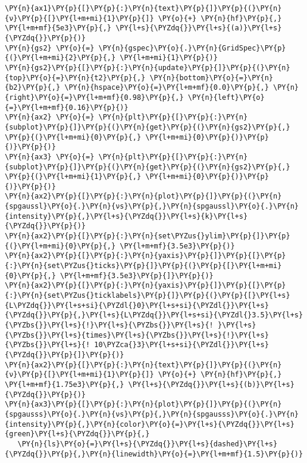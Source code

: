 \begin{Verbatim}[commandchars=\\\{\}]
\PY{n}{ax1}\PY{p}{[}\PY{p}{:}\PY{n}{text}\PY{p}{]}\PY{p}{(}\PY{n}{ν}\PY{p}{[}\PY{l+m+mi}{1}\PY{p}{]} \PY{o}{+} \PY{n}{hf}\PY{p}{,} \PY{l+m+mf}{5e3}\PY{p}{,} \PY{l+s}{\PYZdq{}}\PY{l+s}{(a)}\PY{l+s}{\PYZdq{}}\PY{p}{)}
\PY{n}{gs2} \PY{o}{=} \PY{n}{gspec}\PY{o}{.}\PY{n}{GridSpec}\PY{p}{(}\PY{l+m+mi}{2}\PY{p}{,} \PY{l+m+mi}{1}\PY{p}{)}
\PY{n}{gs2}\PY{p}{[}\PY{p}{:}\PY{n}{update}\PY{p}{]}\PY{p}{(}\PY{n}{top}\PY{o}{=}\PY{n}{t2}\PY{p}{,} \PY{n}{bottom}\PY{o}{=}\PY{n}{b2}\PY{p}{,} \PY{n}{hspace}\PY{o}{=}\PY{l+m+mf}{0.0}\PY{p}{,} \PY{n}{right}\PY{o}{=}\PY{l+m+mf}{0.98}\PY{p}{,} \PY{n}{left}\PY{o}{=}\PY{l+m+mf}{0.16}\PY{p}{)}
\PY{n}{ax2} \PY{o}{=} \PY{n}{plt}\PY{p}{[}\PY{p}{:}\PY{n}{subplot}\PY{p}{]}\PY{p}{(}\PY{n}{get}\PY{p}{(}\PY{n}{gs2}\PY{p}{,} \PY{p}{(}\PY{l+m+mi}{0}\PY{p}{,} \PY{l+m+mi}{0}\PY{p}{)}\PY{p}{)}\PY{p}{)}
\PY{n}{ax3} \PY{o}{=} \PY{n}{plt}\PY{p}{[}\PY{p}{:}\PY{n}{subplot}\PY{p}{]}\PY{p}{(}\PY{n}{get}\PY{p}{(}\PY{n}{gs2}\PY{p}{,} \PY{p}{(}\PY{l+m+mi}{1}\PY{p}{,} \PY{l+m+mi}{0}\PY{p}{)}\PY{p}{)}\PY{p}{)}
\PY{n}{ax2}\PY{p}{[}\PY{p}{:}\PY{n}{plot}\PY{p}{]}\PY{p}{(}\PY{n}{spgaussl}\PY{o}{.}\PY{n}{νs}\PY{p}{,}\PY{n}{spgaussl}\PY{o}{.}\PY{n}{intensity}\PY{p}{,}\PY{l+s}{\PYZdq{}}\PY{l+s}{k}\PY{l+s}{\PYZdq{}}\PY{p}{)}
\PY{n}{ax2}\PY{p}{[}\PY{p}{:}\PY{n}{set\PYZus{}ylim}\PY{p}{]}\PY{p}{(}\PY{l+m+mi}{0}\PY{p}{,} \PY{l+m+mf}{3.5e3}\PY{p}{)}
\PY{n}{ax2}\PY{p}{[}\PY{p}{:}\PY{n}{yaxis}\PY{p}{]}\PY{p}{[}\PY{p}{:}\PY{n}{set\PYZus{}ticks}\PY{p}{]}\PY{p}{(}\PY{p}{[}\PY{l+m+mi}{0}\PY{p}{,} \PY{l+m+mf}{3.5e3}\PY{p}{]}\PY{p}{)}
\PY{n}{ax2}\PY{p}{[}\PY{p}{:}\PY{n}{yaxis}\PY{p}{]}\PY{p}{[}\PY{p}{:}\PY{n}{set\PYZus{}ticklabels}\PY{p}{]}\PY{p}{(}\PY{p}{[}\PY{l+s}{L\PYZdq{}}\PY{l+s+si}{\PYZdl{}0}\PY{l+s+si}{\PYZdl{}}\PY{l+s}{\PYZdq{}}\PY{p}{,}\PY{l+s}{L\PYZdq{}}\PY{l+s+si}{\PYZdl{}3.5}\PY{l+s}{\PYZbs{}}\PY{l+s}{!}\PY{l+s}{\PYZbs{}}\PY{l+s}{! }\PY{l+s}{\PYZbs{}}\PY{l+s}{times}\PY{l+s}{\PYZbs{}}\PY{l+s}{!}\PY{l+s}{\PYZbs{}}\PY{l+s}{! 10\PYZca{}3}\PY{l+s+si}{\PYZdl{}}\PY{l+s}{\PYZdq{}}\PY{p}{]}\PY{p}{)}
\PY{n}{ax2}\PY{p}{[}\PY{p}{:}\PY{n}{text}\PY{p}{]}\PY{p}{(}\PY{n}{ν}\PY{p}{[}\PY{l+m+mi}{1}\PY{p}{]} \PY{o}{+} \PY{n}{hf}\PY{p}{,} \PY{l+m+mf}{1.75e3}\PY{p}{,} \PY{l+s}{\PYZdq{}}\PY{l+s}{(b)}\PY{l+s}{\PYZdq{}}\PY{p}{)}
\PY{n}{ax3}\PY{p}{[}\PY{p}{:}\PY{n}{plot}\PY{p}{]}\PY{p}{(}\PY{n}{spgausss}\PY{o}{.}\PY{n}{νs}\PY{p}{,}\PY{n}{spgausss}\PY{o}{.}\PY{n}{intensity}\PY{p}{,}\PY{n}{color}\PY{o}{=}\PY{l+s}{\PYZdq{}}\PY{l+s}{green}\PY{l+s}{\PYZdq{}}\PY{p}{,}
   \PY{n}{ls}\PY{o}{=}\PY{l+s}{\PYZdq{}}\PY{l+s}{dashed}\PY{l+s}{\PYZdq{}}\PY{p}{,}\PY{n}{linewidth}\PY{o}{=}\PY{l+m+mf}{1.5}\PY{p}{)}

\end{Verbatim}
